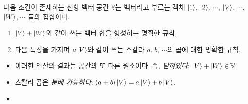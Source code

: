 \begin{definition}
다음 조건이 존재하는 선형 벡터 공간 $\mathbb{V}$는 벡터라고 부르는 객체 $\ket{1}$, $\ket{2}$, $\cdots$, $\ket{V}$, $\cdots$, $\ket{W}$, $\cdots$ 들의 집합이다.
\begin{enumerate}
	\item $\ket{V} + \ket{W}$와 같이 쓰는 벡터 합을 형성하는 명확한 규칙,
	\item 다음 특징을 가지며 $a\ket{V}$와 같이 쓰는 스칼라 $a$, $b$, $\cdots$의 곱에 대한 명확한 규칙.
\end{enumerate}
\begin{itemize}
	\item 이러한 연산의 결과는 공간의 또 다른 원소이다. 즉, \textit{닫혀있다}: $\ket{V} + \ket{W} \in \mathbb{V}$.
	\item 스칼라 곱은 \textit{분배 가능하다}: $(a + b)\ket{V} = a\ket{V} + b\ket{V}$.
	\item 
\end{itemize}
\end{definition}
